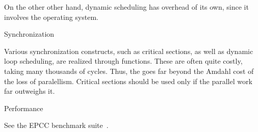 On the other other hand, dynamic scheduling has overhead of its own,
since it involves the operating system.

 {Synchronization}

Various synchronization constructs, such as critical sections, as well as
dynamic loop scheduling, are realized through 
functions. These are often quite costly, taking many thousands of cycles.
Thus, the  goes far beyond
the Amdahl cost of the loss of paralellism. Critical sections should be used only
if the parallel work far outweighs it.

 {Performance}

See the EPCC benchmark suite~\cite{epcc-ompbench}.

\endinput

\Level 0 {Idioms}

\Level 1 {While loops}

\verbatimsnippet{linkedlist}

